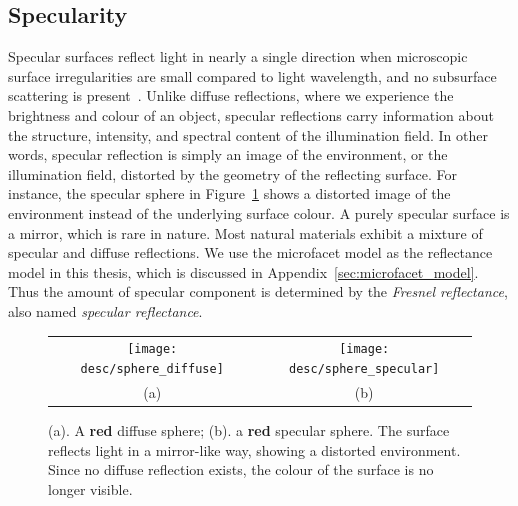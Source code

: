 \subsection{Specularity}
Specular surfaces reflect light in nearly a single direction when microscopic surface irregularities are small compared to light wavelength, and no subsurface scattering is present~\cite{nayar1989surface}. Unlike diffuse reflections, where we experience the brightness and colour of an object, specular reflections carry information about the structure, intensity, and spectral content of the illumination field. In other words, specular reflection is simply an image of the environment, or the illumination field, distorted by the geometry of the reflecting surface. For instance, the specular sphere in Figure~\ref{fig:spec_ref} shows a distorted image of the environment instead of the underlying surface colour. A purely specular surface is a mirror, which is rare in nature. Most natural materials exhibit a mixture of specular and diffuse reflections. We use the microfacet model as the reflectance model in this thesis, which is discussed in Appendix~\ref{sec:microfacet_model}. Thus the amount of specular component is determined by the \textit{Fresnel reflectance}, also named \textit{specular reflectance}.
\begin{figure}[!htbp]
\centering
\begin{tabular}{cc}
\texttt{[image: desc/sphere\_diffuse]}&
\texttt{[image: desc/sphere\_specular]}\\
(a) & (b)\\
\end{tabular}
\caption{(a). A \textbf{red} diffuse sphere; (b). a \textbf{red} specular sphere. The surface reflects light in a mirror-like way, showing a distorted environment. Since no diffuse reflection exists, the colour of the surface is no longer visible.}
\label{fig:spec_ref}
\end{figure}

